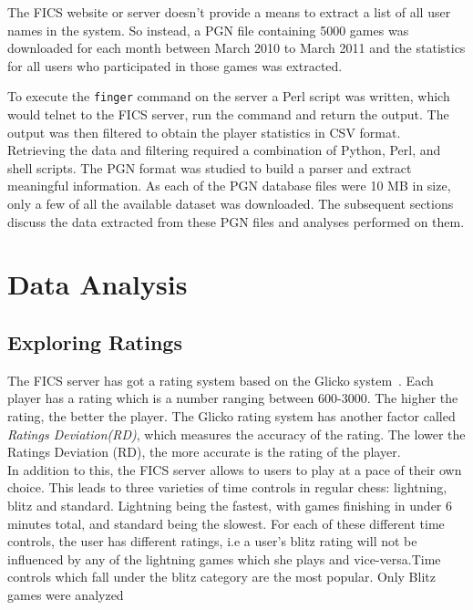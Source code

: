 \documentclass{article}
\begin{document}
\pagebreak

The FICS website or server doesn't provide a means to extract a list of all user names in the system. So instead, a PGN file containing 5000 games was downloaded for each month between March 2010 to March 2011 and the statistics for all users who participated in those games was extracted. 

To execute the \verb=finger= command on the server a Perl script was written, which would telnet to the FICS server, run the command and return the output. The output was then filtered to obtain the player statistics in CSV format. \\

Retrieving the data and filtering required a combination of Python, Perl, and shell scripts. The PGN format was studied to build a parser and extract meaningful information. As each of the PGN database files were 10 MB in size, only a few of all the available dataset was downloaded. The subsequent sections discuss the data extracted from these PGN files and analyses performed on them.


\section{Data Analysis}
\label{sec:analysis}
\subsection{Exploring Ratings}
The FICS server has got a rating system based on the Glicko system~\cite{spec:glicko}. Each player has a rating which is a number ranging between 600-3000. The higher the rating, the better the player. The Glicko rating system has another factor called \textsl{Ratings Deviation(RD)}, which measures the accuracy of the rating. The lower the Ratings Deviation (RD), the more accurate is the rating of the player.\\

In addition to this, the FICS server allows to users to play at a pace of their own choice. This leads to three varieties of time controls in regular chess: lightning, blitz and standard. Lightning being the fastest, with games finishing in under 6 minutes total, and standard being the slowest. For each of these different time controls, the user has different ratings, i.e a user's blitz rating will not be influenced by any of the lightning games which she plays and vice-versa.Time controls which fall under the blitz category are the most popular. Only Blitz games were analyzed\\
\end{document}
